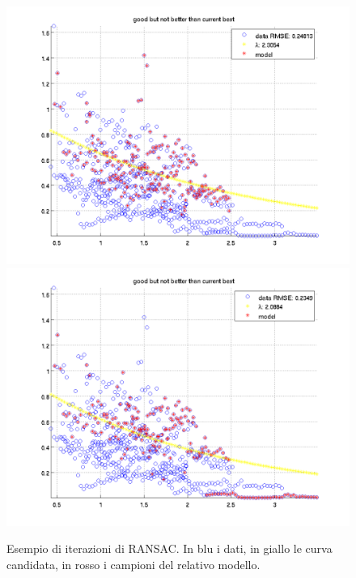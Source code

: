 \documentclass[12pt]{report}
\begin{document}
\begin{figure}[H]
\begin{minipage}[t]{0.5\linewidth}
	\includegraphics[scale=\imFeatRan]{images/ransac2}\\
	\includegraphics[scale=\imFeatRan]{images/ransac4}\\
\end{minipage}
\caption[short]{Esempio di iterazioni di RANSAC. In blu i dati, in giallo le curva candidata, in rosso i campioni del relativo modello.}
\label{fig:ransac1}
\end{figure}
\end{document}
